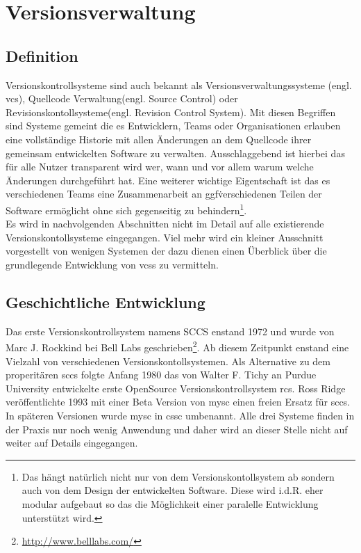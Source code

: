 \chapter{Versionsverwaltung}\label{cha:Versionsverwaltung}
\section{Definition}\label{sec:Definition}
Versionskontrollsysteme sind auch bekannt als Versionsverwaltungssysteme (engl.
\acrlong{vcs}), Quellcode Verwaltung(engl. Source Control) oder
Revisionskontollsysteme(engl. Revision Control System). Mit diesen Begriffen
sind Systeme gemeint die es Entwicklern, Teams oder Organisationen erlauben
eine vollständige Historie mit allen Änderungen an dem Quellcode ihrer
gemeinsam entwickelten Software zu verwalten. Ausschlaggebend ist hierbei das
für alle Nutzer transparent wird wer, wann und vor allem warum welche
Änderungen durchgeführt hat. Eine weiterer wichtige Eigentschaft ist das es
verschiedenen Teams eine Zusammenarbeit an ggf\. verschiedenen Teilen der
Software ermöglicht ohne sich gegenseitig zu
behindern\footnote{\label{dev:1}Das hängt natürlich nicht nur von dem
Versionskontollsystem ab sondern auch von dem Design der entwickelten Software.
Diese wird i.d.R. eher modular aufgebaut so das die Möglichkeit einer paralelle
Entwicklung unterstützt wird.}.\cite[s.~381]{cd}\\

Es wird in nachvolgenden Abschnitten nicht im Detail auf alle existierende
Versionskontollsysteme eingegangen. Viel mehr wird ein kleiner Ausschnitt
vorgestellt von wenigen Systemen der dazu dienen einen Überblick über die
grundlegende Entwicklung von \glspl{vcs} zu vermitteln.

\section{Geschichtliche Entwicklung}\label{sec:GeschichtlicheEntwicklung}
Das erste Versionskontrollsystem namens SCCS enstand 1972 und wurde von Marc J.
Rockkind bei Bell Labs
geschrieben\footnote{\url{http://www.belllabs.com/}}\cite[s.~382]{cd}. Ab diesem
Zeitpunkt enstand eine Vielzahl von verschiedenen Versionskontollsystemen.  Als
Alternative zu dem properitären \acrshort{sccs} folgte Anfang 1980 das von
Walter F. Tichy an Purdue University entwickelte erste \acrlong{OpenSource}
Versionskontrollsystem \acrfull{rcs}\cite{paper:rcs,link:rcs}. Ross Ridge
veröffentlichte 1993 mit einer Beta Version von \acrshort{mysc} einen freien
Ersatz für \acrshort{sccs}. In späteren Versionen wurde \acrshort{mysc} in
\acrfull{cssc} umbenannt\cite{link:cssc,link:mysc}. Alle drei Systeme finden in
der Praxis nur noch wenig Anwendung und daher wird an dieser Stelle nicht auf
weiter auf Details eingegangen.

